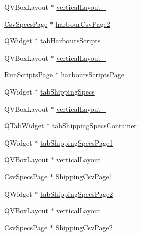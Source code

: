 \begin{DoxyCompactItemize}
\item 
Q\+V\+Box\+Layout $\ast$ \mbox{\hyperlink{class_ui___vessel_editor_main_window_ae47b52693044bcc368f08fb5bf788ccf}{vertical\+Layout\+\_}}
\item 
\mbox{\hyperlink{class_csv_specs_page}{Csv\+Specs\+Page}} $\ast$ \mbox{\hyperlink{class_ui___vessel_editor_main_window_a14cdb210f5a3b917acabd44908b64050}{harbour\+Csv\+Page2}}
\item 
Q\+Widget $\ast$ \mbox{\hyperlink{class_ui___vessel_editor_main_window_af20dd6b70b69b87c460aff9c89e7dd0c}{tab\+Harbours\+Scripts}}
\item 
Q\+V\+Box\+Layout $\ast$ \mbox{\hyperlink{class_ui___vessel_editor_main_window_ad119132ea142e195a62fa540637316ec}{vertical\+Layout\+\_}}
\item 
\mbox{\hyperlink{class_run_scripts_page}{Run\+Scripts\+Page}} $\ast$ \mbox{\hyperlink{class_ui___vessel_editor_main_window_a44189a57b778c61c11af418d6efc952b}{harbours\+Scripts\+Page}}
\item 
Q\+Widget $\ast$ \mbox{\hyperlink{class_ui___vessel_editor_main_window_a3e94dcf9bb208405dc1bb6d33c287389}{tab\+Shipping\+Specs}}
\item 
Q\+V\+Box\+Layout $\ast$ \mbox{\hyperlink{class_ui___vessel_editor_main_window_a37ad2227b0c272803a7b7ab07e677ff1}{vertical\+Layout\+\_}}
\item 
Q\+Tab\+Widget $\ast$ \mbox{\hyperlink{class_ui___vessel_editor_main_window_ad8802d237a3cd271e68c6a772fd489b7}{tab\+Shipping\+Specs\+Container}}
\item 
Q\+Widget $\ast$ \mbox{\hyperlink{class_ui___vessel_editor_main_window_ad730325facaf0d74f5983933bd3e00ef}{tab\+Shipping\+Specs\+Page1}}
\item 
Q\+V\+Box\+Layout $\ast$ \mbox{\hyperlink{class_ui___vessel_editor_main_window_a64c145414a7d5299941cdaa11e6a4efb}{vertical\+Layout\+\_}}
\item 
\mbox{\hyperlink{class_csv_specs_page}{Csv\+Specs\+Page}} $\ast$ \mbox{\hyperlink{class_ui___vessel_editor_main_window_ab8f79cc590630fa1f934ac7fe285fd6c}{Shipping\+Csv\+Page1}}
\item 
Q\+Widget $\ast$ \mbox{\hyperlink{class_ui___vessel_editor_main_window_a24f9f525b7d5090aa736b54e3813a6e6}{tab\+Shipping\+Specs\+Page2}}
\item 
Q\+V\+Box\+Layout $\ast$ \mbox{\hyperlink{class_ui___vessel_editor_main_window_adfea82b6a660f161f3f48af065d7ece8}{vertical\+Layout\+\_}}
\item 
\mbox{\hyperlink{class_csv_specs_page}{Csv\+Specs\+Page}} $\ast$ \mbox{\hyperlink{class_ui___vessel_editor_main_window_ae8aa57c422d5c587be50ca3536a4a004}{Shipping\+Csv\+Page2}}

\end{DoxyCompactItemize}

